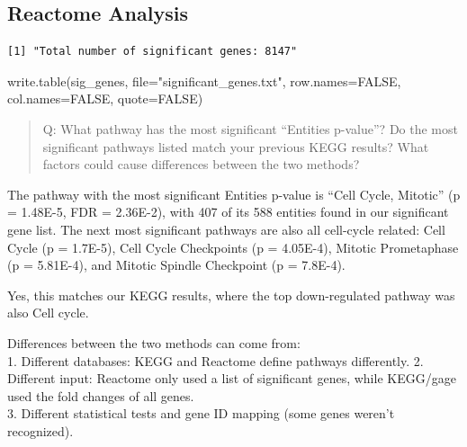 \documentclass[
  letterpaper,
  DIV=11,
  numbers=noendperiod]{scrartcl}
\newenvironment{Shaded}{\begin{snugshade}}{\end{snugshade}}
\newcommand{\AttributeTok}[1]{\textcolor[rgb]{0.40,0.45,0.13}{#1}}
\newcommand{\ConstantTok}[1]{\textcolor[rgb]{0.56,0.35,0.01}{#1}}
\newcommand{\FloatTok}[1]{\textcolor[rgb]{0.68,0.00,0.00}{#1}}
\newcommand{\FunctionTok}[1]{\textcolor[rgb]{0.28,0.35,0.67}{#1}}
\newcommand{\NormalTok}[1]{\textcolor[rgb]{0.00,0.23,0.31}{#1}}
\newcommand{\OtherTok}[1]{\textcolor[rgb]{0.00,0.23,0.31}{#1}}
\newcommand{\SpecialCharTok}[1]{\textcolor[rgb]{0.37,0.37,0.37}{#1}}
\newcommand{\StringTok}[1]{\textcolor[rgb]{0.13,0.47,0.30}{#1}}
\begin{document}
\subsection{Reactome Analysis}\label{reactome-analysis}

\begin{Shaded}
\end{Shaded}

\begin{verbatim}
[1] "Total number of significant genes: 8147"
\end{verbatim}

\begin{Shaded}
\begin{Highlighting}[]
\FunctionTok{write.table}\NormalTok{(sig\_genes, }\AttributeTok{file=}\StringTok{"significant\_genes.txt"}\NormalTok{, }\AttributeTok{row.names=}\ConstantTok{FALSE}\NormalTok{, }\AttributeTok{col.names=}\ConstantTok{FALSE}\NormalTok{, }\AttributeTok{quote=}\ConstantTok{FALSE}\NormalTok{)}
\end{Highlighting}
\end{Shaded}

\begin{quote}
Q: What pathway has the most significant ``Entities p-value''? Do the
most significant pathways listed match your previous KEGG results? What
factors could cause differences between the two methods?
\end{quote}

The pathway with the most significant Entities p-value is ``Cell Cycle,
Mitotic'' (p = 1.48E-5, FDR = 2.36E-2), with 407 of its 588 entities
found in our significant gene list. The next most significant pathways
are also all cell-cycle related: Cell Cycle (p = 1.7E-5), Cell Cycle
Checkpoints (p = 4.05E-4), Mitotic Prometaphase (p = 5.81E-4), and
Mitotic Spindle Checkpoint (p = 7.8E-4).

Yes, this matches our KEGG results, where the top down-regulated pathway
was also Cell cycle.

Differences between the two methods can come from:\\
1. Different databases: KEGG and Reactome define pathways differently.
2. Different input: Reactome only used a list of significant genes,
while KEGG/gage used the fold changes of all genes.\\
3. Different statistical tests and gene ID mapping (some genes weren't
recognized).
\end{document}
